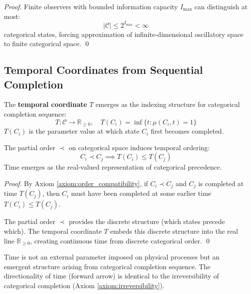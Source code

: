 \begin{proof}
Finite observers with bounded information capacity $I_{\text{max}}$ can distinguish at most:
\begin{equation}
|\mathcal{C}| \leq 2^{I_{\text{max}}} < \infty
\end{equation}
categorical states, forcing approximation of infinite-dimensional oscillatory space to finite categorical space. \qed
\end{proof}

\subsection{Temporal Coordinates from Sequential Completion}

\begin{definition}
\label{def:temporal_coordinate}
The \textbf{temporal coordinate} $T$ emerges as the indexing structure for categorical completion sequence:
\begin{equation}
T: \mathcal{C} \to \mathbb{R}_{\geq 0}, \quad T(C_i) = \inf\{t : \mu(C_i, t) = 1\}
\end{equation}
$T(C_i)$ is the parameter value at which state $C_i$ first becomes completed.
\end{definition}

\begin{theorem}
\label{thm:temporal_emergence}
The partial order $\prec$ on categorical space induces temporal ordering:
\begin{equation}
C_i \prec C_j \implies T(C_i) \leq T(C_j)
\end{equation}
Time emerges as the real-valued representation of categorical precedence.
\end{theorem}

\begin{proof}
By Axiom \ref{axiom:order_compatibility}, if $C_i \prec C_j$ and $C_j$ is completed at time $T(C_j)$, then $C_i$ must have been completed at some earlier time $T(C_i) \leq T(C_j)$.

The partial order $\prec$ provides the discrete structure (which states precede which). The temporal coordinate $T$ embeds this discrete structure into the real line $\mathbb{R}_{\geq 0}$, creating continuous time from discrete categorical order. \qed
\end{proof}

\begin{corollary}
Time is not an external parameter imposed on physical processes but an emergent structure arising from categorical completion sequence. The directionality of time (forward arrow) is identical to the irreversibility of categorical completion (Axiom \ref{axiom:irreversibility}).
\end{corollary}

